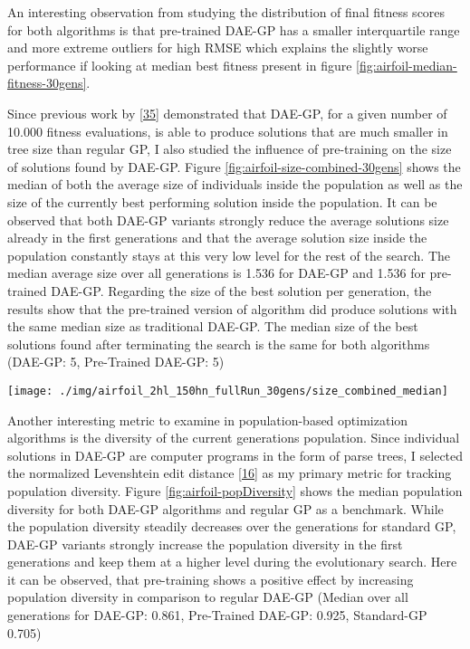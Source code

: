 \documentclass[
  11pt,
]{article}
\let\origfigure\figure
\let\endorigfigure\endfigure
\renewenvironment{figure}[1][2] {
    \expandafter\origfigure\expandafter[H]
} {
    \endorigfigure
}
\begin{document}
An interesting observation from studying the distribution of final fitness scores for both algorithms is that pre-trained DAE-GP has a smaller interquartile range and more extreme outliers for high RMSE which explains the slightly worse performance if looking at median best fitness present in figure \ref{fig:airfoil-median-fitness-30gens}.

Since previous work by {[}\protect\hyperlink{ref-dae-gp_2022_symreg}{35}{]} demonstrated that DAE-GP, for a given number of 10.000 fitness evaluations, is able to produce solutions that are much smaller in tree size than regular GP, I also studied the influence of pre-training on the size of solutions found by DAE-GP.
Figure \ref{fig:airfoil-size-combined-30gens} shows the median of both the average size of individuals inside the population as well as the size of the currently best performing solution inside the population.
It can be observed that both DAE-GP variants strongly reduce the average solutions size already in the first generations and that the average solution size inside the population constantly stays at this very low level for the rest of the search.
The median average size over all generations is 1.536 for DAE-GP and 1.536 for pre-trained DAE-GP.
Regarding the size of the best solution per generation, the results show that the pre-trained version of algorithm did produce solutions with the same median size as traditional DAE-GP.
The median size of the best solutions found after terminating the search is the same for both algorithms (DAE-GP: 5, Pre-Trained DAE-GP: 5)

\begin{figure}[c]

{\centering \texttt{[image: ./img/airfoil\_2hl\_150hn\_fullRun\_30gens/size\_combined\_median]} 

}

\caption{Median Solution Size over 30 Generations - Airfoil}\label{fig:airfoil-size-combined-30gens}
\end{figure}

Another interesting metric to examine in population-based optimization algorithms is the diversity of the current generations population.
Since individual solutions in DAE-GP are computer programs in the form of parse trees, I selected the normalized Levenshtein edit distance {[}\protect\hyperlink{ref-NormLevDistance}{16}{]} as my primary metric for tracking population diversity.
Figure \ref{fig:airfoil-popDiversity} shows the median population diversity for both DAE-GP algorithms and regular GP as a benchmark.
While the population diversity steadily decreases over the generations for standard GP, DAE-GP variants strongly increase the population diversity in the first generations and keep them at a higher level during the evolutionary search.
Here it can be observed, that pre-training shows a positive effect by increasing population diversity in comparison to regular DAE-GP (Median over all generations for DAE-GP: 0.861, Pre-Trained DAE-GP: 0.925, Standard-GP 0.705)
\end{document}
